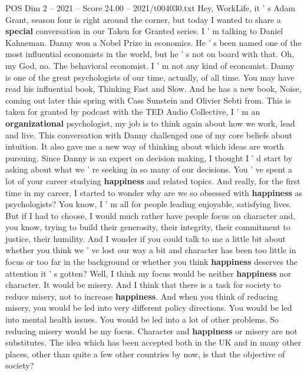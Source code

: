 \begin{textsample}{POS Dim 2 – 2021 – Score 24.00 – 2021/t004030.txt}  \label{ex:f2_pos_030}
Hey, WorkLife, it ' s Adam Grant, season four is right around the corner, but today I wanted to share a \textbf{special} conversation in our Taken for Granted series.
I ' m talking to Daniel Kahneman.
Danny won a Nobel Prize in economics.
He ' s been named one of the most influential economists in the world, but he ' s not on board with that.
Oh, my God, no.
The behavioral economist.
I ' m not any kind of economist.
Danny is one of the great psychologists of our time, actually, of all time.
You may have read his influential book, Thinking Fast and Slow.
And he has a new book, Noise, coming out later this spring with Cass Sunstein and Olivier Sebti from.
This is taken for granted by podcast with the TED Audio Collective, I ' m an \textbf{organizational} psychologist, my job is to think again about how we work, lead and live.
This conversation with Danny challenged one of my core beliefs about intuition.
It also gave me a new way of thinking about which ideas are worth pursuing.
Since Danny is an expert on decision making, I thought I ' d start by asking about what we ' re seeking in so many of our decisions.
You ' ve spent a lot of your career studying \textbf{happiness} and related topics.
And really, for the first time in my career, I started to wonder why are we so obsessed with \textbf{happiness} as psychologists?
You know, I ' m all for people leading enjoyable, satisfying lives.
But if I had to choose, I would much rather have people focus on character and, you know, trying to build their generosity, their integrity, their commitment to justice, their humility.
And I wonder if you could talk to me a little bit about whether you think we ' ve lost our way a bit and character has been too little in focus or too far in the background or whether you think \textbf{happiness} deserves the attention it ' s gotten?
Well, I think my focus would be neither \textbf{happiness} nor character.
It would be misery.
And I think that there is a task for society to reduce misery, not to increase \textbf{happiness}.
And when you think of reducing misery, you would be led into very different policy directions.
You would be led into mental health issues.
You would be led into a lot of other problems.
So reducing misery would be my focus.
Character and \textbf{happiness} or misery are not substitutes.
The idea which has been accepted both in the UK and in many other places, other than quite a few other countries by now, is that the objective of society?

\end{textsample}
